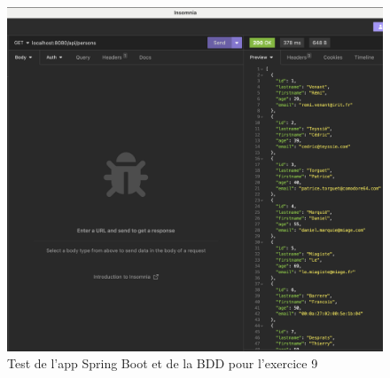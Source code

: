 \begin{figure}[hbtp]
    \centering
    \includegraphics[width=\textwidth]{images/exo9_api.png}
    \caption{Test de l'app Spring Boot et de la BDD pour l'exercice 9}
    \label{fig:exo9_api}
\end{figure}

\newpage

